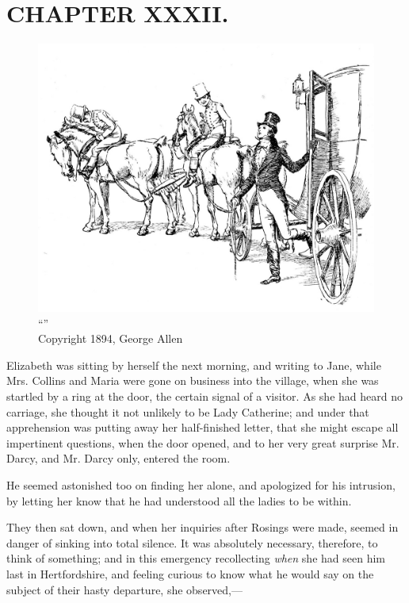\chapter{CHAPTER XXXII.}

\begin{figure}[htbp]
    \centering
    \includegraphics[width=\textwidth]{illustrations/i_031.jpg}
    \caption{“”\\ Copyright 1894, George Allen}
    \label{fig:image}
\end{figure}


Elizabeth was sitting by herself the next morning, and writing to Jane, while Mrs. Collins and Maria were gone on business into the village, when she was startled by a ring at the door, the certain signal of a visitor. As she had heard no carriage, she thought it not unlikely to be Lady Catherine; and under that apprehension was putting away her half-finished letter, that she might escape all impertinent questions, when the door opened, and to her very great surprise Mr. Darcy, and Mr. Darcy only, entered the room.

He seemed astonished too on finding her alone, and apologized for his intrusion, by letting her know that he had understood all the ladies to be within.

They then sat down, and when her inquiries after Rosings were made, seemed in danger of sinking into total silence. It was absolutely necessary, therefore, to think of something; and in this emergency recollecting \textit{when} she had seen him last in Hertfordshire, and feeling curious to know what he would say on the subject of their hasty departure, she observed,---

